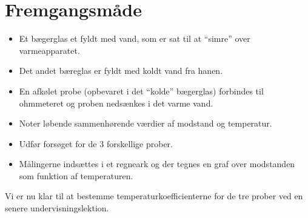 \documentclass[a4paper, 12pt]{article}
\begin{document}
\section*{Fremgangsmåde}
\label{sec:org3624635}
\begin{itemize}
\item Et bægerglas et fyldt med vand, som er sat til at “simre” over varmeapparatet.
\item Det andet bæreglas er fyldt med koldt vand fra hanen.
\item En afkølet probe (opbevaret i det “kolde” bægerglas) forbindes til ohmmeteret og proben nedsænkes i det varme vand.
\item Noter løbende sammenhørende værdier af modstand og temperatur.
\item Udfør forsøget for de 3 forskellige prober.
\item Målingerne indsættes i et regneark og der tegnes en graf over modstanden som funktion af temperaturen.
\end{itemize}

Vi er nu klar til at bestemme temperaturkoefficienterne for de tre prober ved en senere undervisningslektion.
\end{document}
